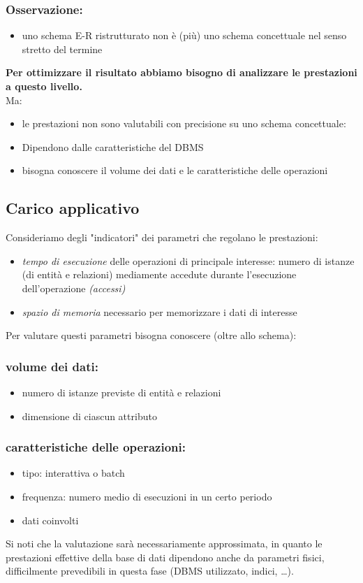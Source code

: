 \subsubsection{Osservazione:}
\begin{itemize}
    \item uno schema E-R ristrutturato non è (più) uno schema concettuale nel senso stretto del termine
\end{itemize}
\textbf{Per ottimizzare il risultato abbiamo bisogno di analizzare le prestazioni a questo livello.}\\
Ma:
\begin{itemize}
    \item le prestazioni non sono valutabili con precisione su uno schema concettuale:
    \item Dipendono dalle caratteristiche del DBMS
    \item bisogna conoscere il volume dei dati e le caratteristiche delle operazioni
\end{itemize}

\subsection{Carico applicativo}
Consideriamo degli "indicatori" dei parametri che regolano le prestazioni:
\begin{itemize}
    \item \textit{tempo di esecuzione} delle operazioni di principale interesse: numero di istanze (di entità e relazioni) mediamente accedute durante l'esecuzione dell'operazione \textit{(accessi)}
    \item \textit{spazio di memoria} necessario per memorizzare i dati di interesse
\end{itemize}
Per valutare questi parametri bisogna conoscere (oltre allo schema):
\subsubsection{volume dei dati:}
\begin{itemize}
    \item numero di istanze previste di entità e relazioni
    \item dimensione di ciascun attributo
\end{itemize}
\subsubsection{caratteristiche delle operazioni:}
\begin{itemize}
    \item tipo: interattiva o batch
    \item frequenza: numero medio di esecuzioni in un certo periodo
    \item dati coinvolti
\end{itemize}
Si noti che la valutazione sarà necessariamente approssimata, in quanto le prestazioni effettive della base di dati dipendono anche da parametri fisici, difficilmente prevedibili in questa fase (DBMS utilizzato, indici, \dots).

